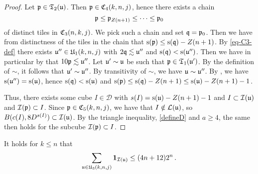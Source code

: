 \begin{proof}
    \leanok
    Let ${\mathfrak p} \in \mathfrak{T}_2({\mathfrak u})$. Then ${\mathfrak p} \in {\mathfrak C}_4(k,n,j)$, hence there exists a chain
    $$
        {\mathfrak p} \le {\mathfrak p}_{Z(n+1)} \le \dotsb \le {\mathfrak p}_0
    $$
    of distinct tiles in ${\mathfrak C}_3(n,k,j)$. We pick such a chain and set ${\mathfrak q} = {\mathfrak p}_0$.
    Then we have from distinctness of the tiles in the chain that
    ${\mathrm{s}}({\mathfrak p}) \le {\mathrm{s}}({\mathfrak q}) - Z(n+1)$.
    By \eqref{eq-C3-def} there exists ${\mathfrak u}'' \in {\mathfrak U}_1(k,n,j)$ with $2{\mathfrak q} \lesssim {\mathfrak u}''$ and ${\mathrm{s}}({\mathfrak q}) < {\mathrm{s}}({\mathfrak u}'')$.
    Then we have in particular by  that $10 {\mathfrak p} \lesssim {\mathfrak u}''$.
    Let ${\mathfrak u}' \sim {\mathfrak u}$ be such that ${\mathfrak p} \in \mathfrak{T}_1({\mathfrak u}')$.
    By the definition of $\sim$, it follows that ${\mathfrak u}' \sim {\mathfrak u}''$.
    By transitivity of $\sim$, we have ${\mathfrak u} \sim {\mathfrak u}''$.
    By , we have ${\mathrm{s}}({\mathfrak u}'') = {\mathrm{s}}({\mathfrak u})$, hence ${\mathrm{s}}({\mathfrak q}) < {\mathrm{s}}({\mathfrak u})$ and ${\mathrm{s}}({\mathfrak p}) \le {\mathrm{s}}({\mathfrak q}) - Z(n+1) \le {\mathrm{s}}({\mathfrak u}) - Z(n+1) - 1$.

    Thus, there exists some cube $I \in \mathcal{D}$ with $s(I) = {\mathrm{s}}({\mathfrak u}) - Z(n+1) - 1$ and $I \subset {\mathcal{I}}({\mathfrak u})$ and ${\mathcal{I}}({\mathfrak p}) \subset I$.
    Since ${\mathfrak p} \in {\mathfrak C}_5(k,n,j)$, we have that $I \notin \mathcal{L}({\mathfrak u})$, so $B(c(I), 8D^{s(I)}) \subset {\mathcal{I}}({\mathfrak u})$.
    By the triangle inequality, \eqref{defineD} and $a \ge 4$, the same then holds for the subcube ${\mathcal{I}}({\mathfrak p}) \subset I$.
\end{proof}


\begin{lemma}
    \label{forest-stacking}
    \leanok
    It holds for $k\le n$ that
    \begin{equation}
        \sum_{{\mathfrak u} \in {\mathfrak U}_3(k,n,j)} \mathbf{1}_{{\mathcal{I}}({\mathfrak u})} \le (4n+12)2^{n}\,.
    \end{equation}
\end{lemma}

